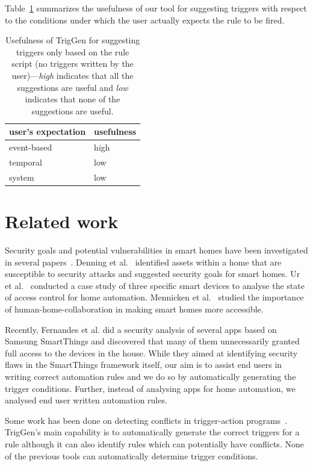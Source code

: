 \documentclass{sig-alternate-05-2015}
\begin{document}
Table~\ref{tab:scope1} summarizes the usefulness of our tool for suggesting triggers with respect to the conditions under which the user actually expects the rule to be fired.
\begin{table}[ht]
\centering
\begin{tabular}{|l|l|}
\hline
user's expectation & usefulness \\ \hline
event-based & high \\ \hline
temporal & low \\\hline
system & low \\ \hline
\end{tabular}
\caption{Usefulness of TrigGen for suggesting triggers only based on the rule script (no triggers written by the user)---\textit{high} indicates that all the suggestions are useful and \textit{low} indicates that none of the suggestions are useful. }
\label{tab:scope1}
\end{table}

\section{Related work}
Security goals and potential vulnerabilities in smart homes have been investigated in several papers~\cite{yoshi, dhanjani, jung, todayToTomorrow}. Denning et al.~\cite{yoshi} identified assets within a home that are susceptible to security attacks and suggested security goals for smart homes. Ur et al.~\cite{jung} conducted a case study of three specific smart devices to analyse the state of access control for home automation. Mennicken et al.~\cite{todayToTomorrow} studied the importance of human-home-collaboration in making smart homes more accessible.

Recently, Fernandes et al.\cite{smartthings16} did a security analysis of several apps based on Samsung SmartThings and discovered that many of them unnecessarily granted full access to the devices in the house. While they aimed at identifying security flaws in the SmartThings framework itself, our aim is to assist end users in writing correct automation rules and we do so by automatically generating the trigger conditions.  Further, instead of analysing apps for home automation, we analysed end user written automation rules.

Some work has been done on detecting conflicts in trigger-action programs~\cite{rvs, homer, utea, Nakamura05featureinteractions}. TrigGen's main capability is to automatically generate the correct triggers for a rule although it can also identify rules which can potentially have conflicts. None of the previous tools can automatically determine trigger conditions.
\end{document}
